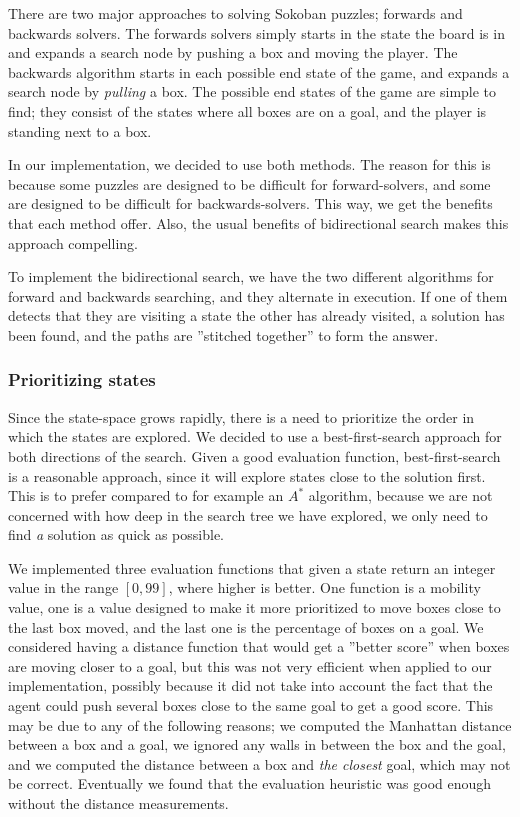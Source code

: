 \documentclass[a4paper,11pt]{article}
\begin{document}
There are two major approaches to solving Sokoban puzzles; forwards and backwards solvers.
The forwards solvers simply starts in the state the board is in and expands a search node
by pushing a box and moving the player.
The backwards algorithm starts in each possible end state of the game,
and expands a search node by \emph{pulling} a box.
The possible end states of the game are simple to find;
they consist of the states where all boxes are on a goal, and the player
is standing next to a box.

In our implementation, we decided to use both methods.
The reason for this is because some puzzles are designed to be difficult
for forward-solvers, and some are designed to be difficult for backwards-solvers.
This way, we get the benefits that each method offer.
Also, the usual benefits of bidirectional search makes this approach compelling.

To implement the bidirectional search, we have the two different algorithms
for forward and backwards searching, and they alternate in execution.
If one of them detects that they are visiting a state the other has already visited,
a solution has been found, and the paths are ''stitched together'' to form the answer.

\subsubsection{Prioritizing states}
\label{sec:prio}

Since the state-space grows rapidly, there is a need to
prioritize the order in which the states are explored.
We decided to use a best-first-search approach for both directions of the search.
Given a good evaluation function, best-first-search is a reasonable
approach, since it will explore states close to the solution first.
This is to prefer compared to for example an $A^*$ algorithm,
because we are not concerned with how deep in the
search tree we have explored, we only need to find 
\emph{a} solution as quick as possible.

We implemented three evaluation functions that given a state return an integer value in the range
$[0, 99]$, where higher is better.
One function is a mobility value, one is a value designed to make
it more prioritized to move boxes close to the last box moved,
and the last one is the percentage of boxes on a goal.
We considered having a distance function that would get a ''better score''
when boxes are moving closer to a goal, but this was not very efficient
when applied to our implementation,
possibly because it did not take into account the fact that the agent could push several boxes
close to the same goal to get a good score.
This may be due to any of the following reasons;
	we computed the Manhattan distance between a box and a goal,
	we ignored any walls in between the box and the goal,
	and we computed the distance between a box and \emph{the closest} goal, which may not be correct.
Eventually we found that the evaluation heuristic was good enough without the distance measurements.
\end{document}
